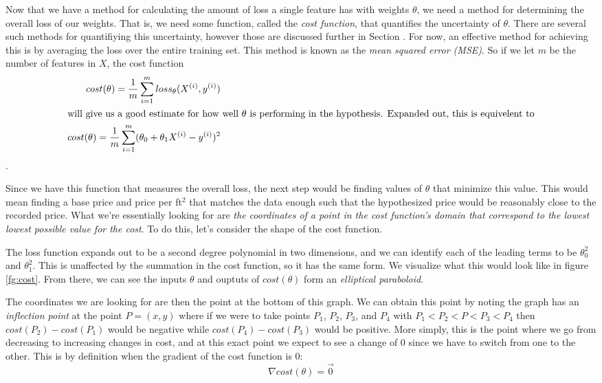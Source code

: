 Now that we have a method for calculating the amount of loss a single feature
has with weights $\theta$, we need a method for determining the overall loss of
our weights. That is, we need some function, called the \emph{cost function},
that quantifies the uncertainty of $\theta$. There are several such methods for
quantifiying this uncertainty, however those are discussed further in Section
\placeholder. For now, an effective method for achieving this is by averaging
the loss over the entire training set. This method is known as the \emph{mean
squared error (MSE)}. So if we let $m$ be the number of features in $X$, the
cost function
\begin{subequations}
    \begin{align}
        cost(\theta) = \frac{1}{m}\sum_{i=1}^m loss_{\theta}(X^{(i)}, y^{(i)}) \\
    \intertext{will give us a good estimate for how well $\theta$ is performing
        in the hypothesis. Expanded out, this is equivelent to}
        cost(\theta) = \frac{1}{m}\sum_{i=1}^m (\theta_0 + \theta_1X^{(i)} -
        y^{(i)})^2
    \end{align}
\end{subequations}
.

Since we have this function that measures the overall loss, the next step
would be finding values of $\theta$ that minimize this value. This would mean
finding a base price and price per ft$^2$ that matches the data enough such that
the hypothesized price would be reasonably close to the recorded price. What we're essentially looking for are \emph{the coordinates of a point in the cost function's domain that correspond to the lowest lowest possible value for the cost}. To do this, let's consider the shape of the cost function.

The loss function expands out to be a second degree polynomial in two dimensions, and we can identify each of the leading terms to be $\theta_0^2$ and $\theta_1^2$. This is unaffected by the summation in the cost function, so it has the same form. We visualize what this would look like in figure \ref{fg:cost}. From there, we can see the inputs $\theta$ and ouptuts of $cost(\theta)$ form an \emph{elliptical paraboloid}.

The coordinates we are looking for are then the point at the bottom of this graph. We can obtain this point by noting the graph has an \emph{inflection point} at the point $P = (x, y)$ where if we were to take points $P_1$, $P_2$, $P_3$, and $P_4$ with $P_1 < P_2 < P < P_3 < P_4$ then $cost(P_2) - cost(P_1)$ would be negative while $cost(P_4) - cost(P_3)$ would be positive. More simply, this is the point where we go from decreasing to increasing changes in cost, and at this exact point we expect to see a change of 0 since we have to switch from one to the other. This is by definition when the gradient of the cost function is 0:
\begin{equation}
	 \nabla cost(\theta) = \vec{0}
\end{equation}


